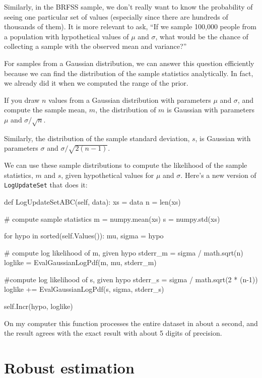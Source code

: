 \documentclass[12pt]{book}
\theoremstyle{exercise}
\begin{document}
Similarly, in the BRFSS sample, we don't really want to know the
probability of seeing one particular set of values (especially since
there are hundreds of thousands of them).  It is more
relevant to ask, ``If we sample 100,000 people from a population
with hypothetical values of $\mu$ and $\sigma$, what would be
the chance of collecting a sample with the observed mean and
variance?''

For samples from a Gaussian distribution, we can answer this question
efficiently because we can find the distribution of the sample
statistics analytically.  In fact, we already did it when we computed
the range of the prior.

If you draw $n$ values from a Gaussian distribution with parameters
$\mu$ and $\sigma$, and compute the sample mean, $m$, the
distribution of $m$ is Gaussian
with parameters $\mu$ and $\sigma / \sqrt{n}$.

Similarly, the distribution of the sample standard deviation, $s$, is
Gaussian with parameters $\sigma$ and $\sigma / \sqrt{2 (n-1)}$.

We can use these sample distributions to compute the likelihood of the
sample statistics, $m$ and $s$, given hypothetical values
for $\mu$ and $\sigma$.  Here's a new version of \verb"LogUpdateSet"
that does it:

\begin{code}
    def LogUpdateSetABC(self, data):
        xs = data
        n = len(xs)

        # compute sample statistics
        m = numpy.mean(xs)
        s = numpy.std(xs)

        for hypo in sorted(self.Values()):
            mu, sigma = hypo

            # compute log likelihood of m, given hypo
            stderr_m = sigma / math.sqrt(n)
            loglike = EvalGaussianLogPdf(m, mu, stderr_m)

            #compute log likelihood of s, given hypo
            stderr_s = sigma / math.sqrt(2 * (n-1))
            loglike += EvalGaussianLogPdf(s, sigma, stderr_s)

            self.Incr(hypo, loglike)
\end{code}

On my computer this function processes the entire dataset in about a
second, and the result agrees with the exact result with about 5
digits of precision.


\section{Robust estimation}
\end{document}
